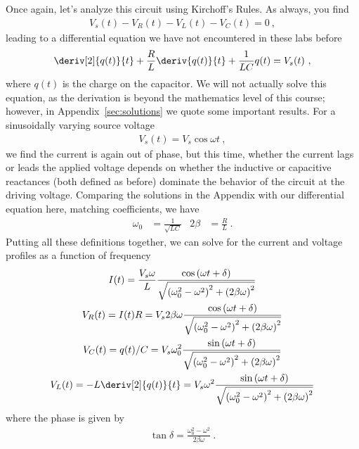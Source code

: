 \documentclass[12pt]{article}
\begin{document}
Once again, let's analyze this circuit using Kirchoff's Rules.  As
always, you find
\begin{gather*}
  V_s(t) - V_R(t) - V_L(t) - V_C(t) = 0\ ,
\end{gather*}
leading to a differential equation we have not encountered in these
labs before
\begin{gather*}
  \deriv[2]{q(t)}{t} + \frac{R}{L} \deriv{q(t)}{t} + \frac{1}{LC} q(t)
  = V_s(t)\ ,
\end{gather*}
where $q(t)$ is the charge on the capacitor.  We will not actually
solve this equation, as the derivation is beyond the mathematics level
of this course; however, in Appendix~\ref{sec:solutions} we quote some
important results.  For a sinusoidally varying source voltage
\begin{gather*}
  V_s(t) = V_s \cos\omega t\ ,
\end{gather*}
we find the current is again out of phase, but this time, whether the
current lags or leads the applied voltage depends on whether the
inductive or capacitive reactances (both defined as before) dominate
the behavior of the circuit at the driving voltage.  Comparing the
solutions in the Appendix with our differential equation here,
matching coefficients, we have
\begin{align*}
  \omega_0 &= \frac{1}{\sqrt{LC}} & 2\beta &= \frac{R}{L}\ .
\end{align*}
Putting all these definitions together, we can solve for the current
and voltage profiles as a function of frequency
\begin{gather*}
  I(t) = \frac{V_s \omega}{L} 
  \frac{\cos\left(\omega t + \delta\right)}
  {\sqrt{\left(\omega_0^2-\omega^2\right)^2 +
      \left(2\beta\omega\right)^2}}\\ 
  V_R(t) = I(t) R = V_s 2\beta\omega 
  \frac{\cos\left(\omega t + \delta\right)}
  {\sqrt{\left(\omega_0^2-\omega^2\right)^2 +
      \left(2\beta\omega\right)^2}}\\
  V_C(t) = q(t)/C = 
  V_s \omega_0^2 \frac{\sin\left(\omega t + \delta\right)}
  {\sqrt{\left(\omega_0^2-\omega^2\right)^2 +
      \left(2\beta\omega\right)^2}}\\ 
  V_L(t) = -L\deriv[2]{q(t)}{t} = 
  V_s \omega^2 \frac{\sin\left(\omega t + \delta\right)}
  {\sqrt{\left(\omega_0^2-\omega^2\right)^2 +
      \left(2\beta\omega\right)^2}}\\ 
\end{gather*}
where the phase is given by 
\begin{gather*}
  \tan \delta = \frac{\omega_0^2-\omega^2}{2\beta\omega}\ .
\end{gather*}
\end{document}
